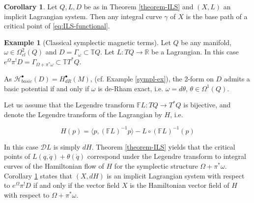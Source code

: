 \documentclass[a4paper,12pt]{amsart}
\theoremstyle{definition}
\newtheorem{Corollary}[Definition]{Corollary}
\newtheorem{Example}[Definition]{Example}
\begin{document}
\begin{Corollary}\label{cor:imp}
Let $Q,L,D$ be as in Theorem \ref{theorem-ILS} and $(X,L)$ an implicit Lagrangian system. Then any integral curve $\gamma$ of $X$ is the base path of a critical point of \eqref{eq:ILS-functional}.  
\end{Corollary}

 
\begin{Example}[Classical symplectic magnetic terms]
Let $Q$ be any manifold, $\omega\in\Omega^2_{cl}(Q)$ and $D=\Gamma_\omega\subset\mathbb TQ$. Let $L:TQ\to\mathbb R$ be a Lagrangian. In this case $e^\Omega\pi^!D=\Gamma_{\Omega+\pi^*\omega}\subset \mathbb TT^*Q$.


As $\mathcal{H}_{basic}^\bullet(D)=H_{dR}^\bullet (M)$, (cf. Example \ref{sympl-ex}), the 2-form on $D$ admits a basic potential if and only if $\omega$ is de-Rham exact, i.e. $\omega=d\theta$, $\theta\in\Omega^1(Q)$.


Let us assume that the Legendre transform $\mathbb FL:TQ\to T^*Q$ is bijective, and denote the Legendre transform of the Lagrangian by $H$, i.e.

$$H(p)=\langle p, (\mathbb FL)^{-1}p\rangle - L\circ (\mathbb FL)^{-1}(p)$$


In this case $\mathcal DL$ is simply $dH$.
Theorem \ref{theorem-ILS} yields that the critical points of $L(q,\dot q)+\theta(\dot q)$ correspond under the Legendre transform to integral curves of the Hamiltonian flow of $H$ for the symplectic structure $\Omega+\pi^*\omega$. 
Corollary \ref{cor:imp} states that $(X,dH)$  is an implicit Lagrangian system with respect to $e^\Omega\pi^!D$ if and only if the vector field $X$ is the Hamiltonian vector field of $H$ with respect to $\Omega+\pi^*\omega$.


\end{Example}
\end{document}
